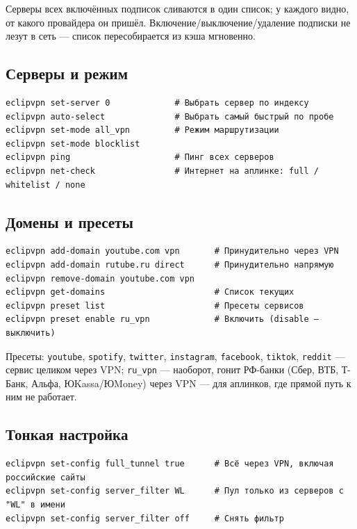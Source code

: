 \documentclass[11pt,a4paper]{article}
\begin{document}
Серверы всех включённых подписок сливаются в один список; у каждого видно, от какого провайдера он пришёл. Включение/выключение/удаление подписки не лезут в сеть --- список пересобирается из кэша мгновенно.

\subsection{Серверы и режим}

\begin{lstlisting}
eclipvpn set-server 0             # Выбрать сервер по индексу
eclipvpn auto-select              # Выбрать самый быстрый по пробе
eclipvpn set-mode all_vpn         # Режим маршрутизации
eclipvpn set-mode blocklist
eclipvpn ping                     # Пинг всех серверов
eclipvpn net-check                # Интернет на аплинке: full / whitelist / none
\end{lstlisting}

\subsection{Домены и пресеты}

\begin{lstlisting}
eclipvpn add-domain youtube.com vpn       # Принудительно через VPN
eclipvpn add-domain rutube.ru direct      # Принудительно напрямую
eclipvpn remove-domain youtube.com vpn
eclipvpn get-domains                      # Список текущих
eclipvpn preset list                      # Пресеты сервисов
eclipvpn preset enable ru_vpn             # Включить (disable — выключить)
\end{lstlisting}

Пресеты: \texttt{youtube}, \texttt{spotify}, \texttt{twitter}, \texttt{instagram}, \texttt{facebook}, \texttt{tiktok}, \texttt{reddit} --- сервис целиком через VPN; \texttt{ru\_vpn} --- наоборот, гонит РФ-банки (Сбер, ВТБ, Т-Банк, Альфа, ЮKassa/ЮMoney) через VPN --- для аплинков, где прямой путь к ним не работает.

\subsection{Тонкая настройка}

\begin{lstlisting}
eclipvpn set-config full_tunnel true      # Всё через VPN, включая российские сайты
eclipvpn set-config server_filter WL      # Пул только из серверов с "WL" в имени
eclipvpn set-config server_filter off     # Снять фильтр
\end{lstlisting}
\end{document}
